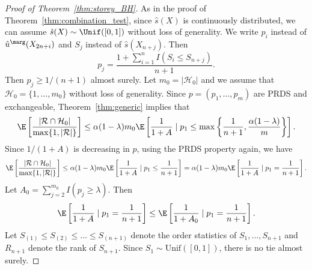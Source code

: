 \begin{proof}[Proof of Theorem~\ref{thm:storey_BH}]
As in the proof of Theorem~\ref{thm:combination_test}, since $\hat{s}(X)$ is continuously distributed, we can assume $\hat{s}(X)\sim \Unif([0, 1])$ without loss of generality. We write $p_i$ instead of $\hat{u}^\marg(X_{2n+i})$ and $S_j$ instead of $\hat{s}(X_{n+j})$. Then
\[p_j = \frac{1 + \sum_{i=1}^{n}I(S_{i}\le S_{n+j})}{n + 1}.\]
Then $p_j\ge 1 / (n + 1)$ almost surely. Let $m_0 = |\mathcal{H}_0|$ and we assume that $\mathcal{H}_0 = \{1, \ldots, m_0\}$ without loss of generality. Since $p = (p_1, \ldots, p_m)$ are PRDS and exchangeable, Theorem~\ref{thm:generic} implies that
\[\E\left[\frac{|\mathcal{R} \cap \mathcal{H}_0|}{\max\{1, |\mathcal{R}|\} } \right]\le \alpha(1 - \lambda)m_0\E\left[\frac{1}{1 + A}\mid p_1\le \max\left\{\frac{1}{n+1}, \frac{\alpha(1 - \lambda)}{m}\right\}\right].\]
Since $1 / (1 + A)$ is decreasing in $p$, using the PRDS property again, we have
\begin{equation}
  \label{eq:fdr_conformal}
  \E\left[\frac{|\mathcal{R} \cap \mathcal{H}_0|}{\max\{1, |\mathcal{R}|\} } \right]\le \alpha(1 - \lambda)m_0\E\left[\frac{1}{1 + A}\mid p_1\le \frac{1}{n+1}\right] = \alpha(1 - \lambda)m_0\E\left[\frac{1}{1 + A}\mid p_1 = \frac{1}{n+1}\right].
\end{equation}
Let $A_0 = \sum_{j=2}^{m_0}I(p_j \ge \lambda)$. Then
\[\E\left[\frac{1}{1 + A}\mid p_1 = \frac{1}{n+1}\right]\le \E\left[\frac{1}{1 + A_0}\mid p_1 = \frac{1}{n+1}\right].\]
Let $S_{(1)}\le S_{(2)}\le \ldots \le S_{(n+1)}$ denote the order statistics of $S_1, \ldots, S_{n+1}$ and $R_{n+1}$ denote the rank of $S_{n+1}$. Since $S_1\sim \mathrm{Unif}([0, 1])$, there is no tie almost surely.


\end{proof}
